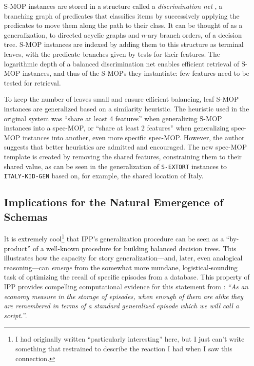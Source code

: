 S-MOP instances are stored in a structure called a \textit{discrimination net} \citep{Charniak:1980:AIP:576572}, a branching graph of predicates that classifies items by successively applying the predicates to move them along the path to their class. It can be thought of as a generalization, to directed acyclic graphs and $n$-ary branch orders, of a decision tree. S-MOP instances are indexed by adding them to this structure as terminal leaves, with the predicate branches given by tests for their features. The logarithmic depth of a balanced discrimination net enables efficient retrieval of S-MOP instances, and thus of the S-MOPs they instantiate: few features need to be tested for retrieval.

To keep the number of leaves small and ensure efficient balancing, leaf S-MOP instances are generalized based on a similarity heuristic. The heuristic used in the original system was ``share at least 4 features'' when generalizing S-MOP instances into a spec-MOP, or ``share at least 2 features'' when generalizing spec-MOP instances into another, even more specific spec-MOP. However, the author suggests that better heuristics are admitted and encouraged. The new spec-MOP template is created by removing the shared features, constraining them to their shared value, as can be seen in the generalization of \texttt{S-EXTORT} instances to \texttt{ITALY-KID-GEN} based on, for example, the shared location of Italy.

\subsection{Implications for the Natural Emergence of Schemas}
It is extremely cool\footnote{I had originally written ``particularly interesting'' here, but I just can't write something that restrained to describe the reaction I had when I saw this connection.} that IPP's generalization procedure can be seen as a ``by-product'' of a well-known procedure for building balanced decision trees. This illustrates how the capacity for story generalization---and, later, even analogical reasoning---can \textit{emerge} from the somewhat more mundane, logistical-sounding task of optimizing the recall of specific episodes from a database. This property of IPP provides compelling computational evidence for this statement from \citep{schankandabelson}: \textit{``As an economy measure in the storage of episodes, when enough of them are alike they are remembered in terms of a standard generalized episode which we will call a script.''}.

